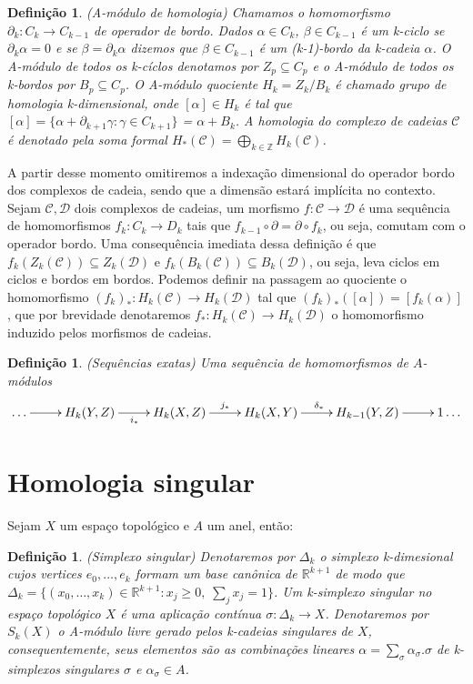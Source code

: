 \documentclass[twoside,openright,titlepage,numbers=noenddot,headinclude,  lineheaders footinclude=true,cleardoublepage=empty,
                                BCOR=5mm,paper=a4,fontsize=12pt ]{scrbook}
\newtheorem{defn}[teo]{Definição}
\newcommand{\homologiarel}[3]{H_{#1}(#2,#3)}
\newcommand{\real}[1]{\mathbb{R}^{#1}}
\begin{document}
\begin{defn}
	(A-módulo de homologia) Chamamos o homomorfismo $\partial_{k}: C_{k} \to C_{k-1} $ de operador de bordo. Dados $\alpha \in C_{k}$, $\beta \in C_{k-1}$  é um k-ciclo se $\partial_{k }\alpha=0$ e se $\beta =  \partial_{k }\alpha$ dizemos que $\beta \in C_{k-1}$ é um (k-1)-bordo da k-cadeia $\alpha$. O A-módulo de todos os k-cíclos denotamos por $Z_{p} \subseteq C_{p}$ e o  A-módulo de todos os k-bordos por $B_{p} \subseteq C_{p}$. O A-módulo quociente $H_{k} = Z_{k} / B_{k}$ é chamado grupo de homologia k-dimensional, onde $[\alpha] \in H_{k}$ é tal que $[\alpha] = \{\alpha+\partial_{k+1}\gamma :\gamma \in  C_{k+1}\}$ = $\alpha + B_{k}$. A homologia do complexo de cadeias $\mathcal{C}$ é denotado pela soma formal $H_{*}(\mathcal{C}) = \bigoplus_{k \in \mathbb{Z}} H_{k}(\mathcal{C})$.
\end{defn}

A partir desse momento omitiremos a indexação dimensional do operador bordo dos complexos de cadeia, sendo que a dimensão estará implícita no contexto. Sejam $\mathcal{C}, \mathcal{D}$ dois complexos de cadeias, um morfismo $f: \mathcal{C} \to \mathcal{D}$ é uma sequência de homomorfismos $f_{k}: C_{k} \to D_{k}$ tais que $f_{k-1}\circ\partial = \partial\circ f_{k}$, ou seja, comutam com o operador bordo. Uma consequência imediata dessa definição é que $f_{k}(Z_{k}(\mathcal{C})) \subseteq Z_{k}(\mathcal{D})$ e $f_{k}(B_{k}(\mathcal{C})) \subseteq B_{k}(\mathcal{D})$, ou seja, leva ciclos em ciclos e bordos em bordos. Podemos definir na passagem ao quociente o homomorfismo $(f_{k})_{*}:H_{k}(\mathcal{C}) \to H_{k}(\mathcal{D})$ tal que $(f_{k})_{*}([\alpha]) = [f_{k}(\alpha)]$, que por brevidade denotaremos $f_{*}:H_{k}(\mathcal{C}) \to H_{k}(\mathcal{D})$ o homomorfismo induzido pelos morfismos de cadeias.

\begin{defn}
	(Sequências exatas) Uma sequência de homomorfismos de $A$-módulos
	$$
	\xymatrix{
		\dots \ar[r] & \homologiarel{k}{Y}{Z} \ar[r]_{i_{*}} & \homologiarel{k}{X}{Z} \ar[r]^{j_{*}} & \homologiarel{k}{X}{Y} \ar[r]^{\delta_{*}} & \homologiarel{k-1}{Y}{Z} \ar[r] & 1\dots
	}
	$$
	
	
\end{defn}

\section{Homologia singular}
Sejam $X$ um espaço topológico e $A$ um anel, então:
\begin{defn}
	(Simplexo singular) Denotaremos por $\Delta_{k}$ o simplexo k-dimesional cujos vertices $e_{0}, \dots, e_{k}$ formam um base canônica de $\real{k+1}$ de modo que $\Delta_{k} = \{(x_{0}, \dots, x_{k}) \in \real{k+1}: x_{j}\geq 0, \;\sum_{j}x_{j}=1\}$. Um k-simplexo singular no espaço topológico $X$ é uma aplicação contínua $\sigma:\Delta_{k} \to X$. Denotaremos por $S_{k}(X)$ o A-módulo livre gerado pelos k-cadeias singulares de $X$, consequentemente, seus elementos são as combinações lineares $\alpha = \sum_{\sigma} \alpha_{\sigma}.\sigma $ de k-simplexos singulares $\sigma$ e $\alpha_{\sigma} \in A$.
\end{defn}
\end{document}
